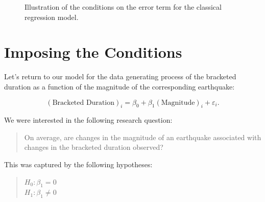 \documentclass[
  letterpaper,
  DIV=11,
  numbers=noendperiod]{scrreprt}
\theoremstyle{definition}
\theoremstyle{definition}
\theoremstyle{plain}
\theoremstyle{remark}
\begin{document}
\begin{figure}


\caption{\label{fig-regconditions-assumptions}Illustration of the
conditions on the error term for the classical regression model.}

\end{figure}%

\section{Imposing the Conditions}\label{imposing-the-conditions}

Let's return to our model for the data generating process of the
bracketed duration as a function of the magnitude of the corresponding
earthquake:

\[(\text{Bracketed Duration})_i = \beta_0 + \beta_1(\text{Magnitude})_i + \varepsilon_i.\]

We were interested in the following research question:

\begin{quote}
On average, are changes in the magnitude of an earthquake associated
with changes in the bracketed duration observed?
\end{quote}

This was captured by the following hypotheses:

\begin{quote}
\(H_0: \beta_1 = 0\)\\
\(H_1: \beta_1 \neq 0\)
\end{quote}
\end{document}
